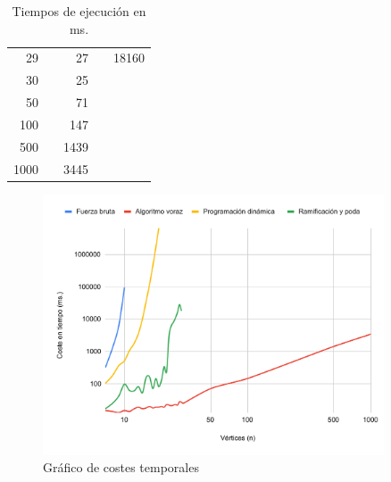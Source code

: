 \documentclass{article}
\begin{document}
\begin{table}[h]
\begin{tabular}{r|rrrr}
        29                                    &                                 & 27                              &                                 & 18160                            \\
        30                                    &                                 & 25                              &                                 &                                  \\
        50                                    &                                 & 71                              &                                 &                                  \\
        100                                   &                                 & 147                             &                                 &                                  \\
        500                                   &                                 & 1439                            &                                 &                                  \\
        1000                                  &                                 & 3445                            &                                 &                                  \\ \hline
    \end{tabular}
    \caption{Tiempos de ejecución en ms.}
    \label{tab:tiempos}
\end{table}

\begin{figure}[h]
    \centering
    \includegraphics[width=0.9\textwidth]{../images/chart}
    \caption{Gráfico de costes temporales}
    \label{graph:tiempos}
\end{figure}
\end{document}
